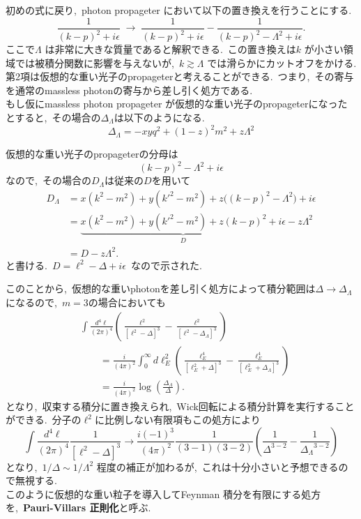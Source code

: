 \documentclass[uplatex,dvipdfmx,a4paper,11pt]{jsarticle}
\begin{document}
初めの式に戻り,~photon propageter において以下の置き換えを行うことにする.
\[
\frac{1}{(k-p)^2+i\epsilon}
\;\longrightarrow\;
\frac{1}{(k-p)^2+i\epsilon}
-\frac{1}{(k-p)^2-\Lambda^2+i\epsilon}.
\]
ここで\(\Lambda\) は非常に大きな質量であると解釈できる.~この置き換えは\(k\) が小さい領域では被積分関数に影響を与えないが,~\(k\gtrsim\Lambda\) では滑らかにカットオフをかける.
第2項は仮想的な重い光子のpropageterと考えることができる.~つまり,~その寄与を通常のmassless photonの寄与から差し引く処方である.~\\
もし仮にmassless photon propageter が仮想的な重い光子のpropageterになったとすると,~その場合の$\Delta_\Lambda$は以下のようになる.
\[
\Delta_\Lambda
=-xyq^2+(1-z)^2m^2+z\Lambda^2
\]
\begin{myproof}
  仮想的な重い光子のpropageterの分母は
\[
(k-p)^2-\Lambda^2+i\epsilon
\]
なので,~その場合の$D_{\Lambda}$は従来の$D$を用いて
\[
\begin{aligned}
D_\Lambda
&=x(k^2-m^2)+y(k'^2-m^2)
+z\bigl((k-p)^2-\Lambda^2\bigr)+i\epsilon
\\
&=\underbrace{
x(k^2-m^2)+y(k'^2-m^2)+z(k-p)^2+i\epsilon
}_{D}
-z\Lambda^2
\\
&=D-z\Lambda^2.
\end{aligned}
\]
と書ける.~$D=\ell^2-\Delta+i \epsilon$~なので示された.
\end{myproof}
このことから,~仮想的な重いphotonを差し引く処方によって積分範囲は$\Delta\to\Delta_\Lambda$になるので,~$m=3$の場合においても
\[
\begin{aligned}
&\int\frac{d^4\ell}{(2\pi)^4}
\left(
\frac{\ell^2}{[\ell^2-\Delta]^3}
-\frac{\ell^2}{[\ell^2-\Delta_\Lambda]^3}
\right)
\\
&\qquad=
\frac{i}{(4\pi)^2}
\int_0^\infty d\ell_E^2
\left(
\frac{\ell_E^4}{[\ell_E^2+\Delta]^3}
-\frac{\ell_E^4}{[\ell_E^2+\Delta_\Lambda]^3}
\right)
\\
&\qquad=
\frac{i}{(4\pi)^2}
\log\!\left(\frac{\Delta_\Lambda}{\Delta}\right).
\end{aligned}
\]
となり,~収束する積分に置き換えられ,~Wick回転による積分計算を実行することができる.~分子の$\ell^2$に比例しない有限項もこの処方により
\[
\int\frac{d^4\ell}{(2\pi)^4}\frac{1}{[\ell^2-\Delta]^3} \to 
\frac{i(-1)^3}{(4\pi)^2}
\frac{1}{(3-1)(3-2)}
\left( \frac{1}{\Delta^{3-2}} - \frac{1}{{\Delta_\Lambda}^{3-2}} \right)
\]
となり,~$1/\Delta \sim 1/\Lambda^2$ 程度の補正が加わるが,~これは十分小さいと予想できるので無視する.~\\
このように仮想的な重い粒子を導入してFeynman 積分を有限にする処方を,~\textbf{Pauri-Villars 正則化}と呼ぶ.~
\end{document}
